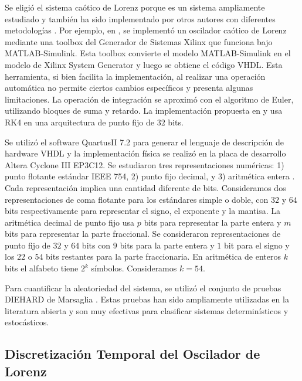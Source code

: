 Se eligió el sistema caótico de Lorenz porque es un sistema ampliamente estudiado y también ha sido implementado por otros autores con diferentes metodologías \cite{Asseri2002, Azzaz2009, Azzaz2010}.
Por ejemplo, en \cite{Asseri2002}, se implementó un oscilador caótico de Lorenz mediante una toolbox del Generador de Sistemas Xilinx que funciona bajo MATLAB-Simulink.
Esta toolbox convierte el modelo MATLAB-Simulink en el modelo de Xilinx System Generator y luego se obtiene el código VHDL.
Esta herramienta, si bien facilita la implementación, al realizar una operación automática no permite ciertos cambios específicos y presenta algunas limitaciones.
La operación de integración se aproximó con el algoritmo de Euler, utilizando bloques de suma y retardo.
La implementación propuesta en \cite{Azzaz2009} y \cite{Azzaz2010} usa RK4 en una arquitectura de punto fijo de $32$ bits.

Se utilizó el software QuartusII 7.2 para generar el lenguaje de descripción de hardware VHDL y la implementación física se realizó en la placa de desarrollo Altera Cyclone III EP3C12.
Se estudiaron tres representaciones numéricas:
1) punto flotante estándar IEEE 754,
2) punto fijo decimal, y
3) aritmética entera \cite{Gonzalez2003}.
Cada representación implica una cantidad diferente de bits.
Consideramos dos representaciones de coma flotante para los estándares simple o doble, con $32$ y $64$ bits respectivamente para representar el signo, el exponente y la mantisa.
La aritmética decimal de punto fijo usa $p$ bits para representar la parte entera y $m$ bits para representar la parte fraccional.
Se consideraron representaciones de punto fijo de $32$ y $64$ bits con $9$ bits para la parte entera y $1$ bit para el signo y los $22$ o $54$ bits restantes para la parte fraccionaria.
En aritmética de enteros $k$ bits el alfabeto tiene $2^k$ símbolos.
Consideramos $k=54$.

Para cuantificar la aleatoriedad del sistema, se utilizó el conjunto de pruebas DIEHARD de Marsaglia \cite{Marsaglia1995}.
Estas pruebas han sido ampliamente utilizadas en la literatura abierta y son muy efectivas para clasificar sistemas determinísticos y estocásticos.

\subsection{Discretización Temporal del Oscilador de Lorenz}
\label{sec:lorenzdigit}

